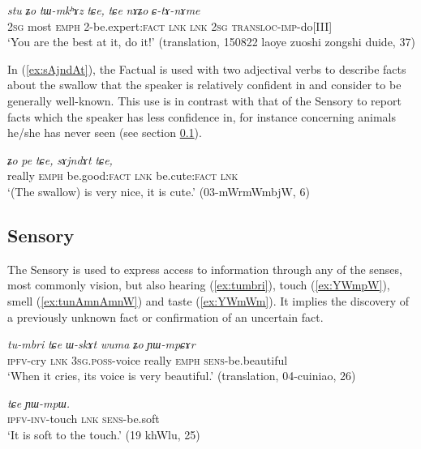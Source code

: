 \documentclass[11pt]{article}
\newcommand{\ipa}[1]{{\phon\textit{#1}}} %
\newcommand{\refb}[1]{(\ref{#1})}
\begin{document}
\begin{exe}
\ex \label{ex:tWmkhAz}
\gll \ipa{nɤʑo} 	\ipa{stu} 	\ipa{ʑo} 	\ipa{tɯ-mkʰɤz} 	\ipa{tɕe,} 	\ipa{tɕe} 	\ipa{nɤʑo} 	\ipa{ɕ-tɤ-nɤme} \\
\textsc{2sg} most \textsc{emph} 2-be.expert:\textsc{fact}   \textsc{lnk} \textsc{lnk} \textsc{2sg} \textsc{transloc-imp}-do[III] \\
\glt `You are the best at it, do it!' (translation, 150822 laoye zuoshi zongshi duide, 37)
\end{exe}

In \refb{ex:sAjndAt}, the Factual is used with two adjectival verbs to describe facts about the swallow that the speaker is relatively confident in and consider to be generally well-known. This use is in contrast with that of the Sensory to report facts which the speaker has less confidence in, for instance concerning animals he/she has never seen (see section \ref{sec:sensory}).

\begin{exe}
\ex \label{ex:sAjndAt}
\gll	\ipa{wuma} 	\ipa{ʑo} 	\ipa{pe} 	\ipa{tɕe,} 	\ipa{sɤjndɤt} 	\ipa{tɕe,} \\
really  \textsc{emph} be.good:\textsc{fact} \textsc{lnk}  be.cute:\textsc{fact} \textsc{lnk} \\
\glt `(The swallow) is very nice, it is cute.' (03-mWrmWmbjW, 6)
\end{exe}


\subsection{Sensory} \label{sec:sensory}
The Sensory is used to express access to information through any of the senses, most commonly vision, but also hearing (\ref{ex:tumbri}), touch (\ref{ex:YWmpW}), smell (\ref{ex:tunAmnAmnW}) and taste (\ref{ex:YWmWm}). It implies the discovery of a previously unknown fact or confirmation of an uncertain fact.

\begin{exe}
\ex \label{ex:tumbri}
\gll
\ipa{tu-mbri} 	\ipa{tɕe} 	\ipa{ɯ-skɤt} 	\ipa{wuma} 	\ipa{ʑo} 	\ipa{ɲɯ-mpɕɤr} \\
\textsc{ipfv}-cry \textsc{lnk} \textsc{3sg.poss}-voice really \textsc{emph} \textsc{sens}-be.beautiful \\
\glt `When it cries, its voice is very beautiful.' (translation, 04-cuiniao, 26)
\end{exe}
\begin{exe}
\ex \label{ex:YWmpW}
\gll \ipa{ɲɯ́-wɣ-nɤmɤle} 	\ipa{tɕe} 	\ipa{ɲɯ-mpɯ.} \\
\textsc{ipfv-inv}-touch \textsc{lnk} \textsc{sens}-be.soft \\
\glt `It is soft to the touch.' (19 khWlu, 25)
\end{exe}
\end{document}
